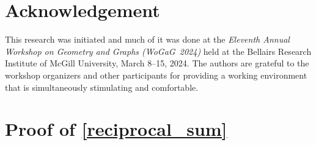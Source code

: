 \documentclass{patmorin}
\begin{document}
\section*{Acknowledgement}

This research was initiated and much of it was done at the \emph{Eleventh Annual Workshop on Geometry and Graphs (WoGaG~2024)} held at the Bellairs Research Institute of McGill University, March 8--15, 2024. The authors are grateful to the workshop organizers and other participants for providing a working environment that is simultaneously stimulating and comfortable.





\appendix

\section{Proof of \texorpdfstring{\cref{reciprocal_sum}}{Lemma?}}
\label{reciprocal_sum_section}


\reciprocalsum*
\end{document}
